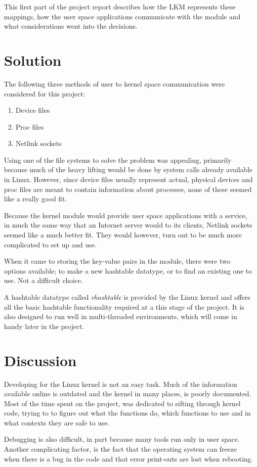 \documentclass[final,a4paper]{article}
\begin{document}
This first part of the project report describes how the LKM represents these
mappings, how the user space applications communicate with the module and
what considerations went into the decisions.\pagebreak

\section*{Solution}
The following three methods of user to kernel space communication were
considered for this project:
\begin{enumerate}
  \setlength\itemsep{0em}
  \item Device files
  \item Proc files
  \item Netlink sockets
\end{enumerate}
Using one of the file systems to solve the problem was appealing, primarily
because much of the heavy lifting would be done by system calls already
available in Linux. However, since device files usually represent actual,
physical devices and proc files are meant to contain information about
processes, none of these seemed like a really good fit.

Because the kernel module would provide user space applications with a service,
in much the same way that an Internet server would to its clients, Netlink
sockets seemed like a much better fit. They would however, turn out to be much
more complicated to set up and use.

When it came to storing the key-value pairs in the module, there were two
options available; to make a new hashtable datatype, or to find an existing
one to use. Not a difficult choice.

A hashtable datatype called \emph{rhashtable} is provided by the
Linux kernel and offers all the basic hashtable functionality required
at a this stage of the project. It is also designed to run well in
multi-threaded environments, which will come in handy later in the project.

\section*{Discussion}
Developing for the Linux kernel is not an easy task. Much of the information
available online is outdated and the kernel in many places, is poorly
documented. Most of the time spent on the project, was dedicated to sifting
through kernel code, trying to to figure out what the functions do, which
functions to use and in what contexts they are safe to use.

Debugging is also difficult, in part because many tools run only in user space.
Another complicating factor, is the fact that the operating system can freeze
when there is a bug in the code and that error print-outs are lost when
rebooting.
\end{document}
